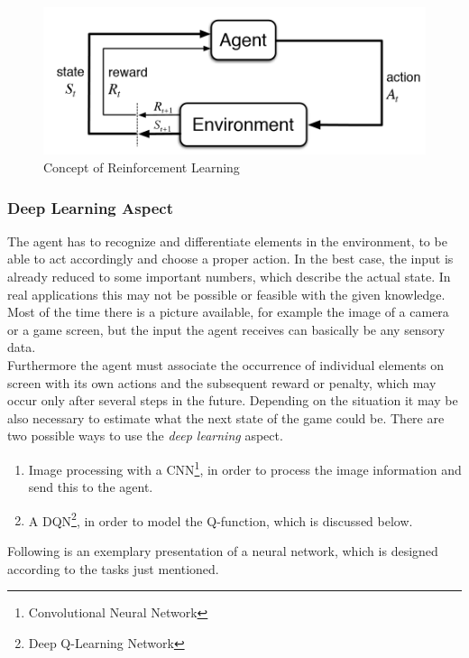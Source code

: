 		\begin{figure}[h!]
			\begin{center}
				\includegraphics[width=0.7\linewidth]{img/eoeSq.png}
				\caption{Concept of Reinforcement Learning}
				\label{concept}
			\end{center}
		\end{figure}

	\subsubsection{Deep Learning Aspect}
		The agent has to recognize and differentiate elements in the environment, to be able to act accordingly and choose a proper action.
		In the best case, the input is already reduced to some important numbers, which describe the actual state.
		In real applications this may not be possible or feasible with the given knowledge.
		Most of the time there is a picture available, for example the image of a camera or a game screen, but the input the agent receives can basically be any sensory data.\\
		Furthermore the agent must associate the occurrence of individual elements on screen with its own actions and the subsequent reward or penalty, which may occur only after several steps in the future.
		Depending on the situation it may be also necessary to estimate what the next state of the game could be.
		There are two possible ways to use the \textit{deep learning} aspect.
		\begin{enumerate}
			\item Image processing with a CNN\footnote{Convolutional Neural Network}, in order to process the image information and send this to the agent.
			\item A DQN\footnote{Deep Q-Learning Network}, in order to model the Q-function, which is discussed below.
		\end{enumerate}
		Following is an exemplary presentation of a neural network, which is designed according to the tasks just mentioned.
